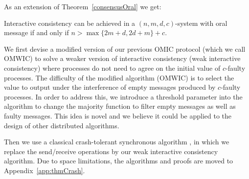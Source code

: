 

As an extension of Theorem~\ref{consensusOral} we get:
\begin{theorem}\label{crashIC}
  Interactive consistency can be achieved in a $( n,m,d,c )$-system with oral
  message if and only if $n> \max \{ 2m+d,2d+m \} +c$.
\end{theorem}


We first devise a modified version of our previous OMIC protocol (which we call OMWIC)
to solve a weaker version of interactive consistency (weak interactive consistency) where 
processes do not need to agree on the initial value  of $c$-faulty processes. 
The difficulty of the modified algorithm (OMWIC) is to select the  value to output under the interference of empty messages produced by $c$-faulty processes. 
In order to address this, we introduce a threshold parameter into the algorithm to change the majority function to filter  empty messages as well as faulty messages. This idea is novel and we believe it could be applied to the design of 
other distributed algorithms.  

Then we use a classical crash-tolerant synchronous algorithm \cite{lamport1982crash,dolev1982polynomial,dwork1990knowledge},  
in which we replace the send/receive operations by our weak interactive consistency algorithm.
Due to space limitations, the algorithms and proofs are moved to Appendix~\ref{app:thmCrash}.





